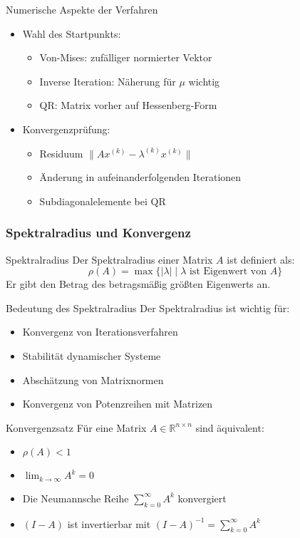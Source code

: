 \begin{corollary}{Numerische Aspekte der Verfahren}
\begin{itemize}
    \item Wahl des Startpunkts:
    \begin{itemize}
        \item Von-Mises: zufälliger normierter Vektor
        \item Inverse Iteration: Näherung für $\mu$ wichtig
        \item QR: Matrix vorher auf Hessenberg-Form
    \end{itemize}
    
    \item Konvergenzprüfung:
    \begin{itemize}
        \item Residuum $\|Ax^{(k)} - \lambda^{(k)}x^{(k)}\|$
        \item Änderung in aufeinanderfolgenden Iterationen
        \item Subdiagonalelemente bei QR
    \end{itemize}
\end{itemize}
\end{corollary}

\subsubsection{Spektralradius und Konvergenz}

\begin{definition}{Spektralradius}
Der Spektralradius einer Matrix $A$ ist definiert als:
$$\rho(A) = \max\{|\lambda| \mid \lambda \text{ ist Eigenwert von } A\}$$
Er gibt den Betrag des betragsmäßig größten Eigenwerts an.
\end{definition}

\begin{concept}{Bedeutung des Spektralradius}
Der Spektralradius ist wichtig für:
\begin{itemize}
    \item Konvergenz von Iterationsverfahren
    \item Stabilität dynamischer Systeme 
    \item Abschätzung von Matrixnormen
    \item Konvergenz von Potenzreihen mit Matrizen
\end{itemize}
\end{concept}
\begin{theorem}{Konvergenzsatz}
Für eine Matrix $A \in \mathbb{R}^{n\times n}$ sind äquivalent:
\begin{itemize}
    \item $\rho(A) < 1$
    \item $\lim_{k\to\infty} A^k = 0$
    \item Die Neumannsche Reihe $\sum_{k=0}^\infty A^k$ konvergiert
    \item $(I-A)$ ist invertierbar mit $(I-A)^{-1} = \sum_{k=0}^\infty A^k$
\end{itemize}
\end{theorem}

